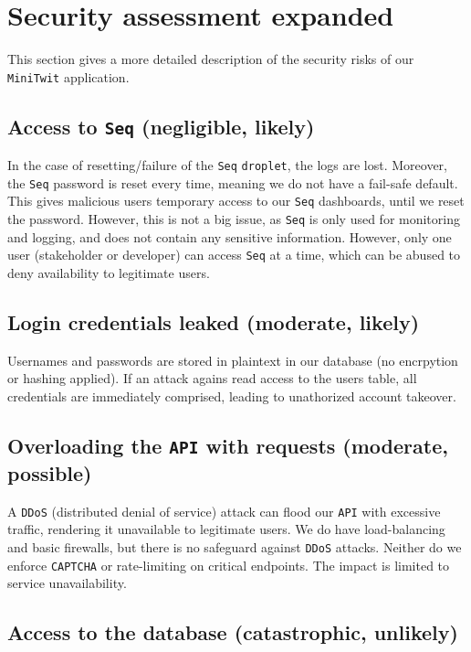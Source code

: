 \section{Security assessment expanded}
\label{appn:B}

This section gives a more detailed description of the security risks
of our \texttt{MiniTwit} application.

\subsection{Access to \texttt{Seq} (negligible, likely)}

In the case of resetting/failure of the \texttt{Seq} \texttt{droplet}, the logs 
are lost. Moreover, the \texttt{Seq} password is reset every time, meaning we 
do not have a fail-safe default. This gives malicious users temporary 
access to our \texttt{Seq} dashboards, until we reset the password. However, 
this is not a big issue, as \texttt{Seq} is only used for monitoring and logging, 
and does not contain any sensitive information. However, only one user 
(stakeholder or developer) can access \texttt{Seq} at a time, 
which can be abused to deny availability to legitimate users.

\subsection{Login credentials leaked (moderate, likely)}

Usernames and passwords are stored in plaintext in our 
database (no encrpytion or hashing applied). If an attack 
agains read access to the users table, all credentials are 
immediately comprised, leading to unathorized account takeover. 

\subsection{Overloading the \texttt{API} with requests (moderate, possible)}

A \texttt{DDoS} (distributed denial of service) attack can flood our \texttt{API} with 
excessive traffic, rendering it unavailable to legitimate users. 
We do have load-balancing and basic firewalls, but there is no 
safeguard against \texttt{DDoS} attacks. Neither do we enforce \texttt{CAPTCHA} or 
rate-limiting on critical endpoints. 
The impact is limited to service unavailability. 

\subsection{Access to the database (catastrophic, unlikely)}

